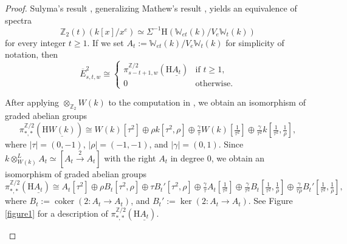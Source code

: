 \documentclass[10pt]{amsart}
\theoremstyle{definition}
\numberwithin{equation}{section}
\newcommand{\W}{\mathbb{W}}
\newcommand{\Z}{\mathbb{Z}}
\newcommand{\rH}{\mathrm{H}}
\newcommand{\ul}{\underline}
\DeclareMathOperator{\coker}{coker}
\begin{document}
{\begin{proof}
Sulyma's result \cite[Theorem 1.1]{MR4632370},
generalizing Mathew's result \cite[Theorem 10.4]{M21},
yields an equivalence of spectra
\[
\Z_2(t)(k[x]/x^e)
\simeq
\Sigma^{-1}\rH(\W_{et}(k)/V_e\W_{t}(k))
\]
for every integer $t\geq 1$.
If we set $A_t:=\W_{et}(k)/V_e\W_{t}(k)$ for simplicity of notation,
then
\[
\overline{E}_{s,t,w}^2\cong
\left\{
\begin{array}{ll}
\pi_{s-t+1,w}^{\Z/2}(\rH \ul{A_t}) & \text{if }t\geq 1,
\\
0 & \text{otherwise}.
\end{array}
\right.
\]

After applying $\otimes_{\Z_2}W(k)$ to the computation in \cite[p.\ 642]{MR4669153},
we obtain an isomorphism of graded abelian groups
\begin{equation}
\label{TCR.6.1}
\pi_{*,*}^{\Z/2}(\rH \ul{W(k)})
\cong
W(k)[\tau^2] \oplus \rho k[\tau^2,\rho]
\oplus
\tfrac{\gamma}{\tau} W(k)[\tfrac{1}{\tau^2}] \oplus \tfrac{\gamma}{\tau^2}k [\tfrac{1}{\tau^2},\tfrac{1}{\rho}],
\end{equation}
where
$\lvert \tau\rvert =(0,-1)$,
$\lvert \rho \rvert = (-1,-1)$,
and $\lvert \gamma \rvert = (0,1)$.
Since $k\otimes_{W(k)}^L A_t\simeq [A_t\xrightarrow{2} A_t]$ with the right $A_t$ in degree $0$,
we obtain an isomorphism of graded abelian groups
\[
\pi_{*,*}^{\Z/2}(\rH \ul{A_t})
\cong
A_t[\tau^2]
\oplus
\rho B_t[\tau^2,\rho]
\oplus
\tau B_t'[\tau^2,\rho]
\oplus
\tfrac{\gamma}{\tau} A_t[\tfrac{1}{\tau^2}]
\oplus
\tfrac{\gamma}{\tau^2}B_t [\tfrac{1}{\tau^2},\tfrac{1}{\rho}] \oplus \tfrac{\gamma}{\tau \rho} B_t'[\tfrac{1}{\tau^2},\tfrac{1}{\rho}],
\]
where $B_t:=\coker(2\colon A_t\to A_t)$,
and $B_t':=\ker(2\colon A_t\to A_t)$.
See Figure \ref{figure1} for a description of $\pi_{*,*}^{\Z/2}(\rH \ul{A_t})$.
\begin{figure}
\end{figure}
\end{proof}}
\end{document}
